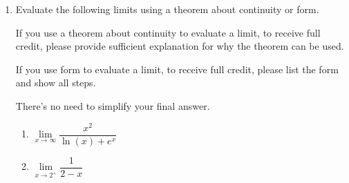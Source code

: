 \documentclass[11pt]{article}
\begin{document}
\begin{enumerate}
\begin{enumerate}
\vfill

\textcolor{blue}{
Take $\log_{11}(x)$ of both sides:
\[
\log_{11}\left(11^{3x+2}\right) = \log_{11}(5).
\]
Using the cancellation rule for logarithms,
\begin{align*}
3x+2 &= \log_{11}(5)\\
\end{align*}
Solve for $x$:
\[
3x+2 = \log_{11}(5)
\quad
3x = \log_{11}(5) - 2,
\quad
x = \frac{1}{3}\left(\log_{11}(5) - 2\right).
\]
}

\vfill

\end{enumerate}


\newpage


\item Evaluate the following limits using a theorem about continuity or form.

If you use a theorem about continuity to evaluate a limit, to receive full credit, please provide sufficient explanation for why the theorem can be used. 

If you use form to evaluate a limit, to receive full credit, please list the form and show all steps. 

There's no need to simplify your final answer.

\begin{enumerate}
    \item $\lim\limits_{x\to\infty}\dfrac{x^2}{\ln(x)+e^x}$ %

    \vfill

    \item $\lim\limits_{x\to 2^+}\dfrac{1}{2-x}$

    \vfill
\end{enumerate}


\newpage



\end{enumerate}
\end{document}
